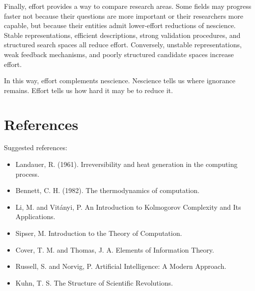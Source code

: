 Finally, effort provides a way to compare research areas. Some fields may progress faster not because their questions are more important or their researchers more capable, but because their entities admit lower-effort reductions of nescience. Stable representations, efficient descriptions, strong validation procedures, and structured search spaces all reduce effort. Conversely, unstable representations, weak feedback mechanisms, and poorly structured candidate spaces increase effort.

In this way, effort complements nescience. Nescience tells us where ignorance remains. Effort tells us how hard it may be to reduce it.

\section*{References}
\label{sec:effort_references}

Suggested references:
\begin{itemize}
    \item Landauer, R. (1961). Irreversibility and heat generation in the computing process.
    \item Bennett, C. H. (1982). The thermodynamics of computation.
    \item Li, M. and Vit\'anyi, P. An Introduction to Kolmogorov Complexity and Its Applications.
    \item Sipser, M. Introduction to the Theory of Computation.
    \item Cover, T. M. and Thomas, J. A. Elements of Information Theory.
    \item Russell, S. and Norvig, P. Artificial Intelligence: A Modern Approach.
    \item Kuhn, T. S. The Structure of Scientific Revolutions.
\end{itemize}
